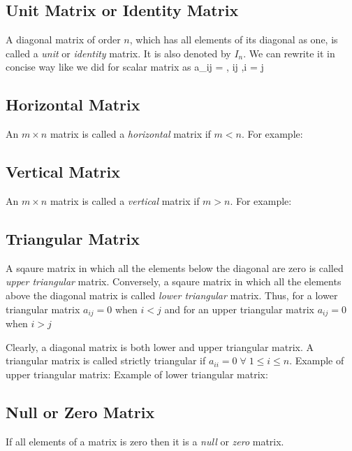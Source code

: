 \subsection{Unit Matrix or Identity Matrix}
A diagonal matrix of order $n$, which has all elements of its diagonal as one, is called a {\it unit} or {\it identity}
matrix. It is also denoted by $I_n$. We can rewrite it in concise way like we did for scalar matrix as
\startformula a_{ij} = \startmathcases{}, \NC i\neq j \NR{},\NC i = j\NR\stopmathcases\stopformula

\subsection{Horizontal Matrix}
An $m\times n$ matrix is called a {\it horizontal} matrix if $m < n$. For example:
\startformula \startbmatrix{}  \NR{}  \NR\stopbmatrix \stopformula

\subsection{Vertical Matrix}
An $m\times n$ matrix is called a {\it vertical} matrix if $m > n$. For example:
\startformula \startbmatrix{}  \NR{}  \NR{} \NR\stopbmatrix \stopformula

\subsection{Triangular Matrix}
A sqaure matrix in which all the elements below the diagonal are zero is called {\it upper triangular} matrix. Conversely, a
sqaure matrix in which all the elements above the diagonal matrix is called {\it lower triangular} matrix. Thus, for a lower
triangular matrix $a_{ij} = 0$ when $i < j$ and for an upper triangular matrix $a_{ij} = 0$ when $i > j$

Clearly, a diagonal matrix is both lower and upper triangular matrix. A triangular matrix is called strictly triangular if $a_{ii}
= 0\;\forall\;1\leq i \leq n$. Example of upper triangular matrix:
\startformula \startbmatrix{}  \NR{}  \NR{}  \NR\stopbmatrix \stopformula
Example of lower triangular matrix:
\startformula \startbmatrix{}  \NR{}  \NR{}  \NR\stopbmatrix \stopformula

\subsection{Null or Zero Matrix}
If all elements of a matrix is zero then it is a {\it null} or {\it zero} matrix.

